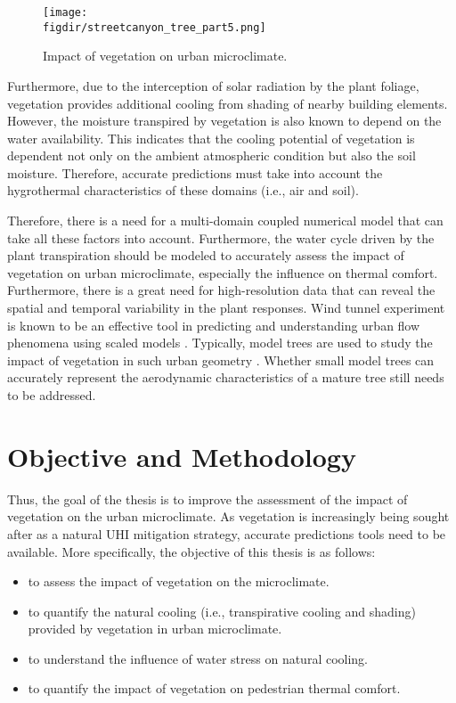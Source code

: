 \begin{figure}[t]
	\centering
	\texttt{[image: \\figdir/streetcanyon\_tree\_part5.png]}
	\caption{Impact of vegetation on urban microclimate.}
	\label{fig:vegetation_fluxes}
\end{figure}

Furthermore, due to the interception of solar radiation by the plant foliage, vegetation provides additional cooling from shading of nearby building elements. However, the moisture transpired by vegetation is also known to depend on the water availability. This indicates that the cooling potential of vegetation is dependent not only on the ambient atmospheric condition but also the soil moisture. Therefore, accurate predictions must take into account the hygrothermal characteristics of these domains (i.e., air and soil).

Therefore, there is a need for a multi-domain coupled numerical model that can take all these factors into account. Furthermore, the water cycle driven by the plant transpiration should be modeled to accurately assess the impact of vegetation on urban microclimate, especially the influence on thermal comfort. Furthermore, there is a great need for high-resolution data that can reveal the spatial and temporal variability in the plant responses. Wind tunnel experiment is known to be an effective tool in predicting and understanding urban flow phenomena using scaled models \citep{Allegrini2012,Paterna2015}. Typically, model trees are used to study the impact of vegetation in such urban geometry \citep{Gromke2008a}. Whether small model trees can accurately represent the aerodynamic characteristics of a mature tree still needs to be addressed. 

\section{Objective and Methodology}

Thus, the goal of the thesis is to improve the assessment of the impact of vegetation on the urban microclimate. As vegetation is increasingly being sought after as a natural UHI mitigation strategy, accurate predictions tools need to be available. More specifically, the objective of this thesis is as follows:
\begin{itemize}
	\item to assess the impact of vegetation on the microclimate.
	\item to quantify the natural cooling (i.e., transpirative cooling and shading) provided by vegetation in urban microclimate.
	\item to understand the influence of water stress on natural cooling.
	\item to quantify the impact of vegetation on pedestrian thermal comfort. 
\end{itemize}

